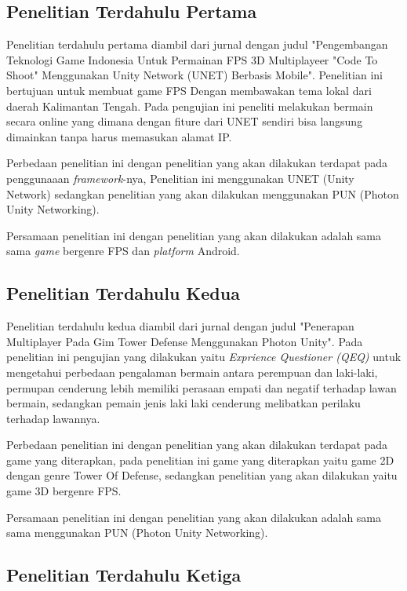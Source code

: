 \doublespacing
\subsection{Penelitian Terdahulu Pertama}
\noindent

Penelitian terdahulu pertama diambil dari jurnal dengan judul "Pengembangan Teknologi Game Indonesia Untuk Permainan FPS 3D Multiplayeer "Code To Shoot" Menggunakan Unity Network (UNET) Berbasis Mobile". Penelitian ini bertujuan untuk membuat game FPS Dengan membawakan tema lokal dari daerah Kalimantan Tengah. Pada pengujian ini peneliti melakukan bermain secara online yang dimana dengan fiture dari UNET sendiri bisa langsung dimainkan tanpa harus memasukan alamat IP.

Perbedaan penelitian ini dengan penelitian yang akan dilakukan terdapat pada penggunaaan \textit{framework}-nya, Penelitian ini menggunakan UNET (Unity Network) sedangkan penelitian yang akan dilakukan menggunakan PUN (Photon Unity Networking).

Persamaan penelitian ini dengan penelitian yang akan dilakukan adalah sama sama \textit{game} bergenre FPS dan \textit{platform} Android.

\subsection{Penelitian Terdahulu Kedua}
\noindent

Penelitian terdahulu kedua diambil dari jurnal dengan judul  "Penerapan Multiplayer Pada Gim Tower Defense Menggunakan Photon Unity". Pada penelitian ini pengujian yang dilakukan yaitu \textit{Exprience Questioner (QEQ)} untuk mengetahui perbedaan pengalaman bermain antara perempuan dan laki-laki, permupan cenderung lebih memiliki perasaan empati dan negatif terhadap lawan bermain, sedangkan pemain jenis laki laki cenderung melibatkan perilaku terhadap lawannya.

Perbedaan penelitian ini dengan penelitian yang akan dilakukan terdapat pada game yang diterapkan, pada penelitian ini game yang diterapkan yaitu game 2D dengan genre Tower Of Defense, sedangkan penelitian yang akan dilakukan yaitu game 3D bergenre FPS.

Persamaan penelitian ini dengan penelitian yang akan dilakukan adalah sama sama menggunakan PUN (Photon Unity Networking).

\subsection{Penelitian Terdahulu Ketiga}
\noindent

